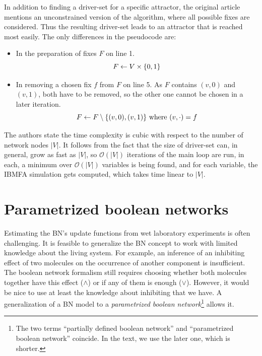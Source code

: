 \documentclass[
	digital, oneside, nosansbold, nocolorbold, nolot, nolof
]{fithesis4}
\theoremstyle{definition}
\theoremstyle{definition}
\DeclarePairedDelimiter{\set}{\{}{\}}
\begin{document}
In addition to finding a driver-set for a specific attractor, the original
article mentions an unconstrained version of the algorithm, where all possible
fixes are considered. Thus the resulting driver-set leads to an attractor that
is reached most easily. The only differences in the pseudocode are:
\begin{itemize}
    \item In the preparation of fixes $F$ on line 1.
        \[
            F \gets V \times \set{0, 1}
        \]
    \item In removing a chosen fix $f$ from $F$ on line 5. As $F$ contains
        $(v, 0)$ and $(v, 1)$, both have to be removed, so the other one
        cannot be chosen in a later iteration.
        \[
            F \gets F \setminus \set{(v, 0), (v, 1)}
                \text{ where } (v, \cdot) = f
        \]
\end{itemize}
The authors state the time complexity is cubic with respect to the number of
network nodes $|V|$. It follows from the fact that the size of driver-set can,
in general, grow as fast as $|V|$, so $\mathcal{O}(|V|)$ iterations of the main
loop are run, in each, a minimum over $\mathcal{O}(|V|)$ variables is being
found, and for each variable, the IBMFA simulation gets computed, which takes
time linear to $|V|$.


\section{Parametrized boolean networks}

Estimating the BN's update functions from wet laboratory experiments is often
challenging. It is feasible to generalize the BN concept to work with limited
knowledge about the living system. For example, an inference of an inhibiting
effect of two molecules on the occurrence of another component is insufficient.
The boolean network formalism still requires choosing whether both molecules
together have this effect ($\land$) or if any of them is enough ($\lor$).
However, it would be nice to use at least the knowledge about inhibiting that
we have. A generalization of a BN model to a \emph{parametrized boolean
network}\footnote{The two terms \enquote{partially defined boolean network} and
\enquote{parametrized boolean network} coincide. In the text, we use the later
one, which is shorter.} allows it.
\end{document}
